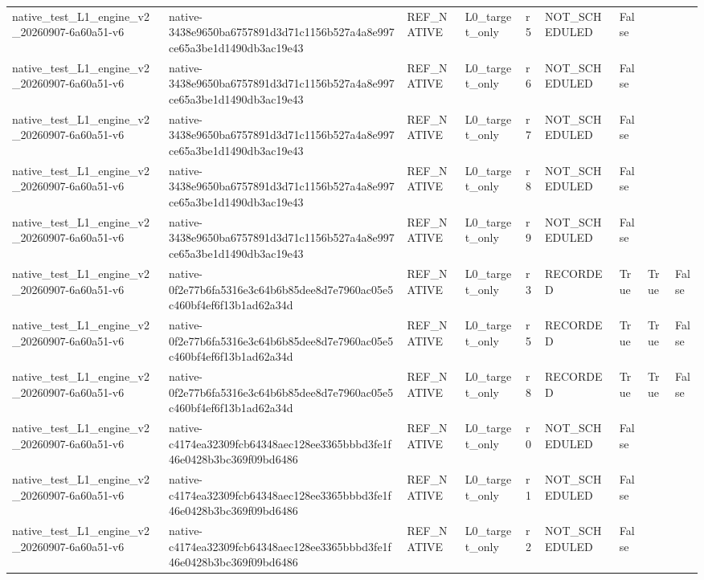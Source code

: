 \begin{tabular}{lllllllll}
native\_test\_L1\_engine\_v2\_20260907-6a60a51-v6 & native-3438e9650ba6757891d3d71c1156b527a4a8e997ce65a3be1d1490db3ac19e43 & REF\_NATIVE & L0\_target\_only & r5 & NOT\_SCHEDULED & False &  &  \\
native\_test\_L1\_engine\_v2\_20260907-6a60a51-v6 & native-3438e9650ba6757891d3d71c1156b527a4a8e997ce65a3be1d1490db3ac19e43 & REF\_NATIVE & L0\_target\_only & r6 & NOT\_SCHEDULED & False &  &  \\
native\_test\_L1\_engine\_v2\_20260907-6a60a51-v6 & native-3438e9650ba6757891d3d71c1156b527a4a8e997ce65a3be1d1490db3ac19e43 & REF\_NATIVE & L0\_target\_only & r7 & NOT\_SCHEDULED & False &  &  \\
native\_test\_L1\_engine\_v2\_20260907-6a60a51-v6 & native-3438e9650ba6757891d3d71c1156b527a4a8e997ce65a3be1d1490db3ac19e43 & REF\_NATIVE & L0\_target\_only & r8 & NOT\_SCHEDULED & False &  &  \\
native\_test\_L1\_engine\_v2\_20260907-6a60a51-v6 & native-3438e9650ba6757891d3d71c1156b527a4a8e997ce65a3be1d1490db3ac19e43 & REF\_NATIVE & L0\_target\_only & r9 & NOT\_SCHEDULED & False &  &  \\
native\_test\_L1\_engine\_v2\_20260907-6a60a51-v6 & native-0f2e77b6fa5316e3c64b6b85dee8d7e7960ac05e5c460bf4ef6f13b1ad62a34d & REF\_NATIVE & L0\_target\_only & r3 & RECORDED & True & True & False \\
native\_test\_L1\_engine\_v2\_20260907-6a60a51-v6 & native-0f2e77b6fa5316e3c64b6b85dee8d7e7960ac05e5c460bf4ef6f13b1ad62a34d & REF\_NATIVE & L0\_target\_only & r5 & RECORDED & True & True & False \\
native\_test\_L1\_engine\_v2\_20260907-6a60a51-v6 & native-0f2e77b6fa5316e3c64b6b85dee8d7e7960ac05e5c460bf4ef6f13b1ad62a34d & REF\_NATIVE & L0\_target\_only & r8 & RECORDED & True & True & False \\
native\_test\_L1\_engine\_v2\_20260907-6a60a51-v6 & native-c4174ea32309fcb64348aec128ee3365bbbd3fe1f46e0428b3bc369f09bd6486 & REF\_NATIVE & L0\_target\_only & r0 & NOT\_SCHEDULED & False &  &  \\
native\_test\_L1\_engine\_v2\_20260907-6a60a51-v6 & native-c4174ea32309fcb64348aec128ee3365bbbd3fe1f46e0428b3bc369f09bd6486 & REF\_NATIVE & L0\_target\_only & r1 & NOT\_SCHEDULED & False &  &  \\
native\_test\_L1\_engine\_v2\_20260907-6a60a51-v6 & native-c4174ea32309fcb64348aec128ee3365bbbd3fe1f46e0428b3bc369f09bd6486 & REF\_NATIVE & L0\_target\_only & r2 & NOT\_SCHEDULED & False &  &  \\

\end{tabular}
